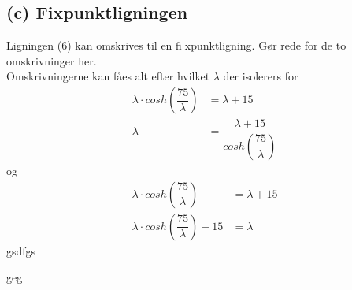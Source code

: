 \subsection*{(c) Fixpunktligningen}
 Ligningen (6) kan omskrives til en fixpunktligning. Gør rede for de to omskrivninger her.\\
Omskrivningerne kan fåes alt efter hvilket $\lambda$ der isolerers for
\begin{align*}
\lambda \cdot cosh(\dfrac{75}{\lambda})&=\lambda+15\\
\lambda&=\dfrac{\lambda+15}{cosh(\dfrac{75}{\lambda})}
\end{align*}
og
\begin{align*}
\lambda \cdot cosh(\dfrac{75}{\lambda})&=\lambda+15\\
\lambda \cdot cosh(\dfrac{75}{\lambda})-15 &=\lambda
\end{align*}
gsdfgs
\lstset{style=mystyle}

geg
\lstset{style=mystyle}
